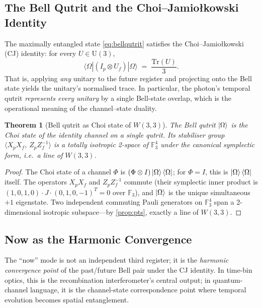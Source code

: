 ﻿\documentclass[12pt]{article}
\newtheorem{theorem}{Theorem}[section]
\newcommand{\GF}[1]{\mathbb{F}_{#1}}
\begin{document}
\subsection{The Bell Qutrit and the Choi--Jamio\l kowski Identity}

The maximally entangled state \eqref{eq:bellqutrit} satisfies the
Choi--Jamio\l kowski (CJ) identity: for every $U \in \mathrm{U}(3)$,
\begin{equation}
  \langle\Omega| (I_p\otimes U_f) |\Omega\rangle
  \;=\; \frac{\mathrm{Tr}(U)}{3}.
  \label{eq:choi}
\end{equation}
That is, applying \emph{any} unitary to the future register and projecting onto the
Bell state yields the unitary's normalised trace.  In particular, the photon's
temporal qutrit \emph{represents every unitary} by a single Bell-state overlap,
which is the operational meaning of the channel--state duality.

\begin{theorem}[Bell qutrit as Choi state of $W(3,3)$]\label{thm:bellchoi}
The Bell qutrit $\ket{\Omega}$ is the Choi state of the identity channel on a single
qutrit.  Its stabiliser group $\langle X_p X_f,\ Z_p Z_f^{-1}\rangle$ is a totally
isotropic 2-space of $\GF{3}^4$ under the canonical symplectic form, i.e.\ a
\emph{line of $W(3,3)$}.
\end{theorem}

\begin{proof}
The Choi state of a channel $\Phi$ is $(\Phi\otimes I)\ket{\Omega}\langle\Omega|$;
for $\Phi = I$, this is $\ket{\Omega}\langle\Omega|$ itself.  The operators
$X_p X_f$ and $Z_p Z_f^{-1}$ commute (their symplectic inner product is
$(1,0,1,0)\cdot J\cdot(0,1,0,-1)^T = 0$ over $\GF{3}$), and $\ket{\Omega}$ is the
unique simultaneous $+1$ eigenstate.  Two independent commuting Pauli generators
on $\GF{3}^4$ span a 2-dimensional isotropic subspace---by
\cref{prop:pts}, exactly a line of $W(3,3)$.
\end{proof}

\subsection{Now as the Harmonic Convergence}

The ``now'' mode is not an independent third register; it is the
\emph{harmonic convergence point} of the past/future Bell pair under the CJ
identity.  In time-bin optics, this is the recombination interferometer's central
output; in quantum-channel language, it is the channel-state correspondence point
where temporal evolution becomes spatial entanglement.
\end{document}
